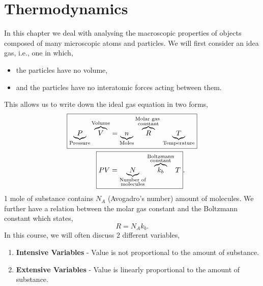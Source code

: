 \documentclass{book}
\begin{document}
\chapter{Thermodynamics}
In this chapter we deal with analysing the macroscopic properties of objects composed of many microscopic atoms and particles. We will first consider an idea gas, i.e., one in which,
\begin{itemize}
	\item the particles have no volume,
	\item and the particles have no interatomic forces acting between them.
\end{itemize}
This allows us to write down the ideal gas equation in two forms,
\begin{align}
	\boxed{\underbrace{P}_{\text{Pressure}}\overbrace{V}^{\text{Volume}} = \underbrace{n}_{\text{Moles}}\overbrace{R}^{\substack{\text{Molar gas }\\{\text{constant}}}}\underbrace{T}_{\text{Temperature}}} \\
	\boxed{PV = \underbrace{N}_{\substack{\text{Number of}\\\text{molecules}}} \overbrace{k_b}^{\substack{\text{Boltzmann}\\\text{constant}} } T}. \hspace{0.6cm}
\end{align}
1 mole of substance contains $N_A$ (Avogadro's number) amount of molecules. We further have a relation between the molar gas constant and the Boltzmann constant which states,
\begin{equation}
	R = N_Ak_b.
\end{equation}
In this course, we will often discuss 2 different variables,
\begin{enumerate}
	\item \textbf{Intensive Variables} - Value is not proportional to the amount of substance.
	\item \textbf{Extensive Variables} - Value is linearly proportional to the amount of substance. 
\end{enumerate}
\end{document}
